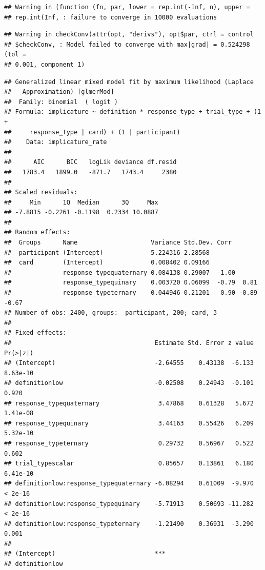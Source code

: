 \documentclass[floatsintext,man]{apa6}
\theoremstyle{definition}
\theoremstyle{definition}
\theoremstyle{definition}
\theoremstyle{remark}
\begin{document}
\begin{verbatim}
## Warning in (function (fn, par, lower = rep.int(-Inf, n), upper =
## rep.int(Inf, : failure to converge in 10000 evaluations
\end{verbatim}

\begin{verbatim}
## Warning in checkConv(attr(opt, "derivs"), opt$par, ctrl = control
## $checkConv, : Model failed to converge with max|grad| = 0.524298 (tol =
## 0.001, component 1)
\end{verbatim}

\begin{verbatim}
## Generalized linear mixed model fit by maximum likelihood (Laplace
##   Approximation) [glmerMod]
##  Family: binomial  ( logit )
## Formula: implicature ~ definition * response_type + trial_type + (1 +  
##     response_type | card) + (1 | participant)
##    Data: implicature_rate
## 
##      AIC      BIC   logLik deviance df.resid 
##   1783.4   1899.0   -871.7   1743.4     2380 
## 
## Scaled residuals: 
##     Min      1Q  Median      3Q     Max 
## -7.8815 -0.2261 -0.1198  0.2334 10.0887 
## 
## Random effects:
##  Groups      Name                    Variance Std.Dev. Corr             
##  participant (Intercept)             5.224316 2.28568                   
##  card        (Intercept)             0.008402 0.09166                   
##              response_typequaternary 0.084138 0.29007  -1.00            
##              response_typequinary    0.003720 0.06099  -0.79  0.81      
##              response_typeternary    0.044946 0.21201   0.90 -0.89 -0.67
## Number of obs: 2400, groups:  participant, 200; card, 3
## 
## Fixed effects:
##                                       Estimate Std. Error z value Pr(>|z|)
## (Intercept)                           -2.64555    0.43138  -6.133 8.63e-10
## definitionlow                         -0.02508    0.24943  -0.101    0.920
## response_typequaternary                3.47868    0.61328   5.672 1.41e-08
## response_typequinary                   3.44163    0.55426   6.209 5.32e-10
## response_typeternary                   0.29732    0.56967   0.522    0.602
## trial_typescalar                       0.85657    0.13861   6.180 6.41e-10
## definitionlow:response_typequaternary -6.08294    0.61009  -9.970  < 2e-16
## definitionlow:response_typequinary    -5.71913    0.50693 -11.282  < 2e-16
## definitionlow:response_typeternary    -1.21490    0.36931  -3.290    0.001
##                                          
## (Intercept)                           ***
## definitionlow                            

\end{verbatim}
\end{document}
